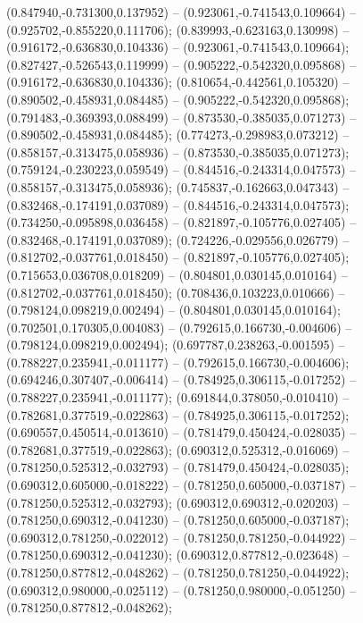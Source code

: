  (0.847940,-0.731300,0.137952) -- (0.923061,-0.741543,0.109664) -- (0.925702,-0.855220,0.111706);
 (0.839993,-0.623163,0.130998) -- (0.916172,-0.636830,0.104336) -- (0.923061,-0.741543,0.109664);
 (0.827427,-0.526543,0.119999) -- (0.905222,-0.542320,0.095868) -- (0.916172,-0.636830,0.104336);
 (0.810654,-0.442561,0.105320) -- (0.890502,-0.458931,0.084485) -- (0.905222,-0.542320,0.095868);
 (0.791483,-0.369393,0.088499) -- (0.873530,-0.385035,0.071273) -- (0.890502,-0.458931,0.084485);
 (0.774273,-0.298983,0.073212) -- (0.858157,-0.313475,0.058936) -- (0.873530,-0.385035,0.071273);
 (0.759124,-0.230223,0.059549) -- (0.844516,-0.243314,0.047573) -- (0.858157,-0.313475,0.058936);
 (0.745837,-0.162663,0.047343) -- (0.832468,-0.174191,0.037089) -- (0.844516,-0.243314,0.047573);
 (0.734250,-0.095898,0.036458) -- (0.821897,-0.105776,0.027405) -- (0.832468,-0.174191,0.037089);
 (0.724226,-0.029556,0.026779) -- (0.812702,-0.037761,0.018450) -- (0.821897,-0.105776,0.027405);
 (0.715653,0.036708,0.018209) -- (0.804801,0.030145,0.010164) -- (0.812702,-0.037761,0.018450);
 (0.708436,0.103223,0.010666) -- (0.798124,0.098219,0.002494) -- (0.804801,0.030145,0.010164);
 (0.702501,0.170305,0.004083) -- (0.792615,0.166730,-0.004606) -- (0.798124,0.098219,0.002494);
 (0.697787,0.238263,-0.001595) -- (0.788227,0.235941,-0.011177) -- (0.792615,0.166730,-0.004606);
 (0.694246,0.307407,-0.006414) -- (0.784925,0.306115,-0.017252) -- (0.788227,0.235941,-0.011177);
 (0.691844,0.378050,-0.010410) -- (0.782681,0.377519,-0.022863) -- (0.784925,0.306115,-0.017252);
 (0.690557,0.450514,-0.013610) -- (0.781479,0.450424,-0.028035) -- (0.782681,0.377519,-0.022863);
 (0.690312,0.525312,-0.016069) -- (0.781250,0.525312,-0.032793) -- (0.781479,0.450424,-0.028035);
 (0.690312,0.605000,-0.018222) -- (0.781250,0.605000,-0.037187) -- (0.781250,0.525312,-0.032793);
 (0.690312,0.690312,-0.020203) -- (0.781250,0.690312,-0.041230) -- (0.781250,0.605000,-0.037187);
 (0.690312,0.781250,-0.022012) -- (0.781250,0.781250,-0.044922) -- (0.781250,0.690312,-0.041230);
 (0.690312,0.877812,-0.023648) -- (0.781250,0.877812,-0.048262) -- (0.781250,0.781250,-0.044922);
 (0.690312,0.980000,-0.025112) -- (0.781250,0.980000,-0.051250) -- (0.781250,0.877812,-0.048262);
